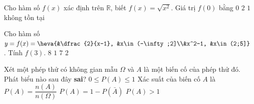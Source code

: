 

\begin{ex}%
	Cho hàm số $f(x)$ xác định trên $\mathbb{R}$, biết $f(x)=\sqrt{x^2}$. Giá trị  $f(0)$ bằng
	 \choice
		{\True $0$} 
		{$2$} 
		{$1$} 
		{không tồn tại} 
\end{ex}

\begin{ex}%
	 Cho hàm số $y=f(x)=\heva{&\dfrac{2}{x-1}, &x\in(-\infty;2]\\&x^2-1, &x\in(2;5]}$. Tính $f(3)$.
	 \choice
		{\True $8$} 
		 {$1$}
		{$7$} 
		 {$2$}
	\loigiai{ 
		Với $x=3\in (2;5]$ thì hàm số có dạng $f(x)=x^2-1$.\\ 
	Khi đó  $f(3)=3^2-1=8$.}
\end{ex}

\begin{ex}%
	Xét một phép thử có không gian mẫu $\Omega $ và $A$ là một biến cố của phép thử đó. Phát biểu  nào sau đây \textbf{sai}?
	 \choice
		{$0\le P\left(A\right)\le 1$} 
		{Xác suất  của biến cố $A$ là $P\left(A\right)=\dfrac{n\left(A\right)}{n\left(\Omega\right)}$}
		 {$P\left(A\right)=1-P\left(\bar{A}\right)$}
		{\True $P\left(A\right)>1$} 
\end{ex}



